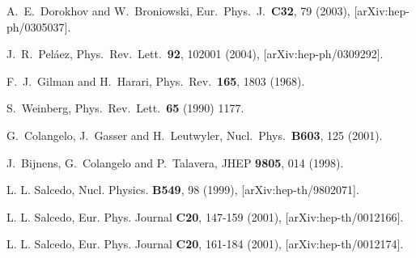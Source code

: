 \begin{thebibliography}{10}
A.~E.~Dorokhov and W.~Broniowski,
Eur.\ Phys.\ J.\ {\bf C32}, 79 (2003),
[arXiv:hep-ph/0305037].



  J.~R.~Pel\'aez,
  Phys.\ Rev.\ Lett.\  {\bf 92}, 102001 (2004),
  [arXiv:hep-ph/0309292].

F.~J.~Gilman and H.~Harari,
Phys.\ Rev.\  {\bf 165}, 1803 (1968).


S.~Weinberg,
Phys.\ Rev.\ Lett.\  {\bf 65} (1990) 1177.


G.~Colangelo, J.~Gasser and H.~Leutwyler,
Nucl.\ Phys.\ {\bf B603}, 125 (2001).

J.~Bijnens, G.~Colangelo and P.~Talavera,
JHEP {\bf 9805}, 014 (1998).


 L. L. Salcedo, Nucl. Physics. {\bf B549}, 98 (1999), [arXiv:hep-th/9802071].


 L. L. Salcedo, Eur. Phys. Journal {\bf C20}, 147-159
  (2001),   [arXiv:hep-th/0012166].



 L. L. Salcedo, Eur. Phys. Journal {\bf C20}, 161-184
  (2001),   [arXiv:hep-th/0012174].

%






\end{thebibliography}






